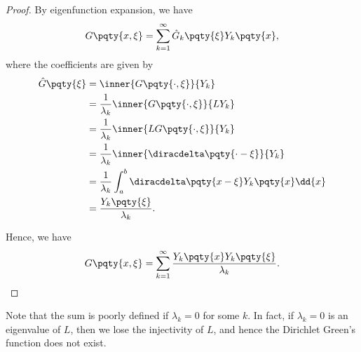 \begin{proof}
    By eigenfunction expansion, we have
    \begin{equation}
        G\pqty{x, \xi} = \sum_{k = 1}^{\infty} \hat{G}_k\pqty{\xi} Y_k\pqty{x},
    \end{equation}
    where the coefficients are given by
    \begin{subequations}
        \begin{align}
            \hat{G} \pqty{\xi} &= \inner{G\pqty{\cdot, \xi}}{Y_k} \\
            &= \frac{1}{\lambda_k} \inner{G\pqty{\cdot, \xi}}{L Y_k} \\
            &= \frac{1}{\lambda_k} \inner{L G\pqty{\cdot, \xi}}{Y_k} \\
            &= \frac{1}{\lambda_k} \inner{\diracdelta\pqty{\cdot - \xi}}{Y_k} \\
            &= \frac{1}{\lambda_k} \int_{a}^{b} \diracdelta\pqty{x - \xi} Y_k\pqty{x} \dd{x} \\
            &= \frac{Y_k\pqty{\xi}}{\lambda_k}.
        \end{align}
    \end{subequations}

    Hence, we have
    \begin{equation}
        G\pqty{x, \xi} = \sum_{k = 1}^{\infty} \frac{Y_k\pqty{x} Y_k\pqty{\xi}}{\lambda_k}.
    \end{equation}
\end{proof}

\small

Note that the sum is poorly defined if \(\lambda_k = 0\) for some \(k\). In fact, if \(\lambda_k = 0\) is an eigenvalue of \(L\), then we lose the injectivity of \(L\), and hence the Dirichlet Green's function does not exist.

\normalsize

